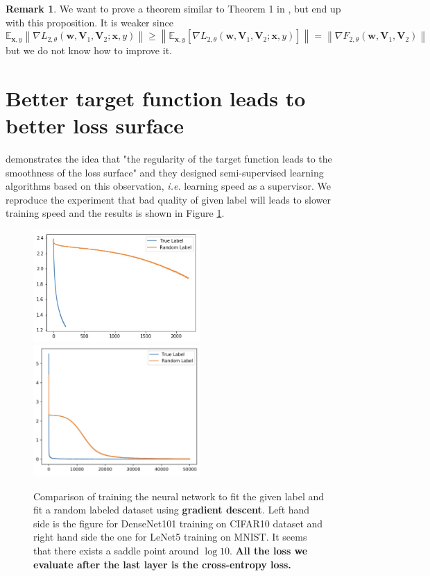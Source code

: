 \documentclass{article}
\theoremstyle{plain}
\theoremstyle{definition}
\newtheorem{rem}{Remark}
\newcommand{\norm}[1]{\left\lVert#1\right\rVert}
\begin{document}
\begin{rem}
	We want to prove a theorem similar to Theorem 1 in \cite{2018arXiv180406739S}, but end up with this proposition. It is weaker since
	\[\mathbb{E}_{\mathbf{x},y}\norm{\nabla L_{2,\theta}(\mathbf{w},\mathbf{V}_1,\mathbf{V}_2;\mathbf{x},y)}\geq\norm{\mathbb{E}_{\mathbf{x},y}\left[\nabla L_{2,\theta}(\mathbf{w},\mathbf{V}_1,\mathbf{V}_2;\mathbf{x},y)\right]}=\norm{\nabla F_{2,\theta}(\mathbf{w},\mathbf{V}_1,\mathbf{V}_2)}\]
	but we do not know how to improve it.
\end{rem}

\section{Better target function leads to better loss surface}

\cite{cicek2018saas,cicek2018input} demonstrates the idea that "the regularity of the target function leads to the smoothness of the loss surface" and they designed semi-supervised learning algorithms based on this observation, \emph{i.e.} learning speed as a supervisor. We reproduce the experiment that bad quality of given label will leads to slower training speed and the results is shown in Figure \ref{saas}.

\begin{figure}[htp]
	\centering
	\includegraphics[width=2.5in]{cifar.jpeg}
	\includegraphics[width=2.5in]{mnist.jpg}
	\caption{Comparison of training the neural network to fit the given label and fit a random labeled dataset using \textbf{gradient descent}. Left hand side is the figure for DenseNet101 training on CIFAR10 dataset and right hand side the one for LeNet5 training on MNIST. It seems that there exists a saddle point around $\log 10$. \textbf{All the loss we evaluate after the last layer is the cross-entropy loss.}}
	\label{saas}
\end{figure}
\end{document}
